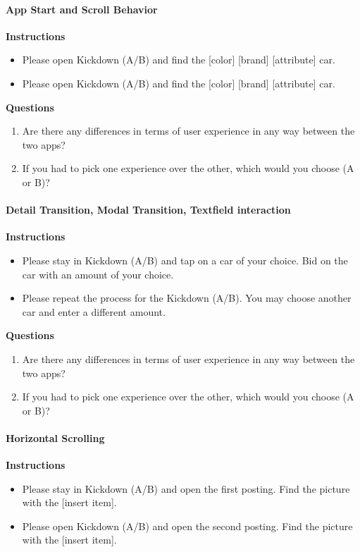 \paragraph*{App Start and Scroll Behavior}\hfill \break
\textbf{Instructions}
\begin{itemize}
    \item Please open Kickdown (A/B) and find the [color] [brand] [attribute] car.
    \item Please open Kickdown (A/B) and find the [color] [brand] [attribute] car.
\end{itemize}

\textbf{Questions}
\begin{enumerate}
    \item Are there any differences in terms of user experience in any way between the two apps?
    \item If you had to pick one experience over the other, which would you choose (A or B)?
\end{enumerate}

\paragraph*{Detail Transition, Modal Transition, Textfield interaction}\hfill \break
\textbf{Instructions}
\begin{itemize}
    \item Please stay in Kickdown (A/B) and tap on a car of your choice. Bid on the car with an amount of your choice.
    \item Please repeat the process for the Kickdown (A/B). You may choose another car and enter a different amount.
\end{itemize}

\textbf{Questions}
\begin{enumerate}
    \item Are there any differences in terms of user experience in any way between the two apps?
    \item If you had to pick one experience over the other, which would you choose (A or B)?
\end{enumerate}


\paragraph*{Horizontal Scrolling}\hfill \break
\textbf{Instructions}
\begin{itemize}
    \item Please stay in Kickdown (A/B) and open the first posting. Find the picture with the [insert item].
    \item Please open Kickdown (A/B) and open the second posting. Find the picture with the [insert item].
\end{itemize}

